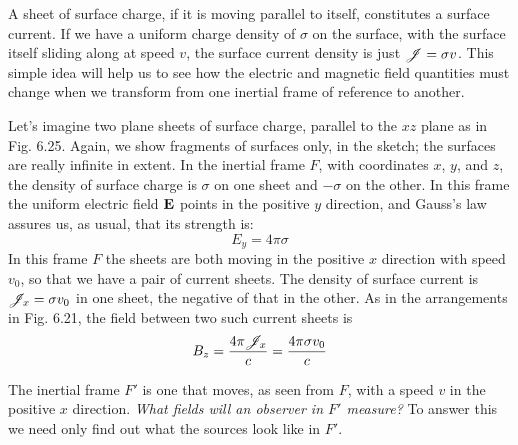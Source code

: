 A sheet of surface charge, if it is moving parallel to itself, constitutes
a surface current. If we have a uniform charge density of $\sigma$
on the surface, with the surface itself sliding along at speed $v$, the
surface current density is just $\mathscr{J}=\sigma v$. This simple idea will help us
to see how the electric and magnetic field quantities must change
when we transform from one inertial frame of reference to another.

Let's imagine two plane sheets of surface charge, parallel to the
$xz$ plane as in Fig. 6.25. Again, we show fragments of surfaces only,
in the sketch; the surfaces are really infinite in extent. In the inertial
frame $F$, with coordinates $x$, $y$, and $z$, the density of surface charge
is $\sigma$ on one sheet and $-\sigma$ on the other. In this frame the uniform
electric field $\mathbf{E}$ points in the positive $y$ direction, and Gauss's law
assures us, as usual, that its strength is:
\begin{equation}
  E_y = 4\pi\sigma
\end{equation}
In this frame $F$ the sheets are both moving in the positive $x$ direction
with speed $v_0$, so that we have a pair of current sheets. The
density of surface current is $\mathscr{J}_x=\sigma v_0$ in one sheet, the negative of
that in the other. As in the arrangements in Fig. 6.21, the field between
two such current sheets is
\begin{equation}
  B_z = \frac{4\pi\mathscr{J}_x}{c} = \frac{4\pi\sigma v_0}{c} 
\end{equation}

The inertial frame $F'$ is one that moves, as seen from $F$, with a speed
$v$ in the positive $x$ direction. \emph{What fields will an observer in $F'$
measure?} To answer this we need only find out what the sources look
like in $F'$.

